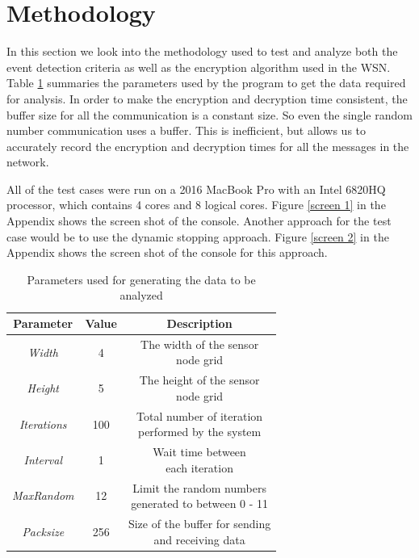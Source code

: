 \documentclass[conference]{IEEEtran}
\begin{document}
	
	\section{Methodology}\label{method}

	In this section we look into the methodology used to test and analyze both the event detection criteria as well as the encryption algorithm used in the WSN. Table \ref{params} summaries the parameters used by the program to get the data required for analysis. In order to make the encryption and decryption time consistent, the buffer size for all the communication is a constant size. So even the single random number communication uses a buffer. This is inefficient, but allows us to accurately record the encryption and decryption times for all the messages in the network.
	
	All of the test cases were run on a 2016 MacBook Pro with an Intel 6820HQ processor, which contains 4 cores and 8 logical cores. Figure \ref{screen 1} in the Appendix shows the screen shot of the console. Another approach for the test case would be to use the dynamic stopping approach. Figure \ref{screen 2} in the Appendix shows the screen shot of the console for this approach.
		
	\begin{table}[!h]\caption{Parameters used for generating the data to be analyzed}
		\begin{center}
			\renewcommand{\arraystretch}{1.2}
			\begin{tabular}{| c | c | c |} 
				\hline
				\textbf{Parameter} & \textbf{Value} & \textbf{Description} \\ \hline
				\emph{Width}    &  4   & \makecell{The width of the sensor \\ node grid }   \\ \hline
				\emph{Height}    &  5   & \makecell{The height of the sensor \\ node grid }   \\ \hline
				\emph{Iterations}    &  100   & \makecell{Total number of iteration \\ performed by the system }   \\ \hline
				\emph{Interval}    &  1   & \makecell{Wait time between \\ each iteration }   \\ \hline
				\emph{MaxRandom}    &  12   & \makecell{Limit the random numbers \\ generated to between 0 - 11}   \\ \hline
				\emph{Packsize}    &  256  & \makecell{Size of the buffer for sending\\ and receiving data }   \\ \hline
			\end{tabular}
			\label{params}
		\end{center}
	\end{table}
\end{document}
